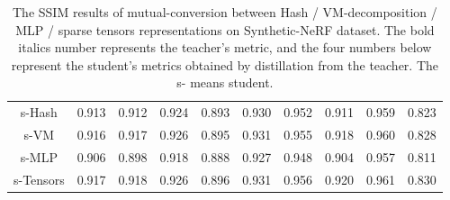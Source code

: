 \documentclass[letterpaper]{article} \usepackage{aaai23}  \usepackage{times}  \usepackage{helvet}  \usepackage{courier}  \usepackage[hyphens]{url}  \usepackage{graphicx} \urlstyle{rm} \def\UrlFont{\rm}  \usepackage{natbib}  \usepackage{caption} \frenchspacing  \setlength{\pdfpagewidth}{8.5in}  \setlength{\pdfpageheight}{11in}  \usepackage{multirow}
\begin{document}
\begin{table*}[t]
{\begin{tabular}{c|ccccccccc}
s-Hash                      & 0.913                   & 0.912                   & 0.924                   & 0.893                   & 0.930                   & 0.952                   & 0.911                   & 0.959                   & 0.823                   \\
s-VM                        & 0.916                   & 0.917                   & 0.926                   & 0.895                   & 0.931                   & 0.955                   & 0.918                   & 0.960                   & 0.828                   \\
s-MLP                       & 0.906                   & 0.898                   & 0.918                   & 0.888                   & 0.927                   & 0.948                   & 0.904                   & 0.957                   & 0.811                   \\
s-Tensors                   & 0.917                   & 0.918                   & 0.926                   & 0.896                   & 0.931                   & 0.956                   & 0.920                   & 0.961                   & 0.830                   \\ \hline
\end{tabular}
}
\caption{ The SSIM results of mutual-conversion between Hash / VM-decomposition / MLP /
sparse tensors representations on  Synthetic-NeRF dataset. The bold italics number represents the teacher's metric, and the four numbers below represent the student's metrics obtained by distillation from the teacher. The s- means
student.}
\label{tab-ssim-mutual-syn}
\end{table*}
\end{document}

